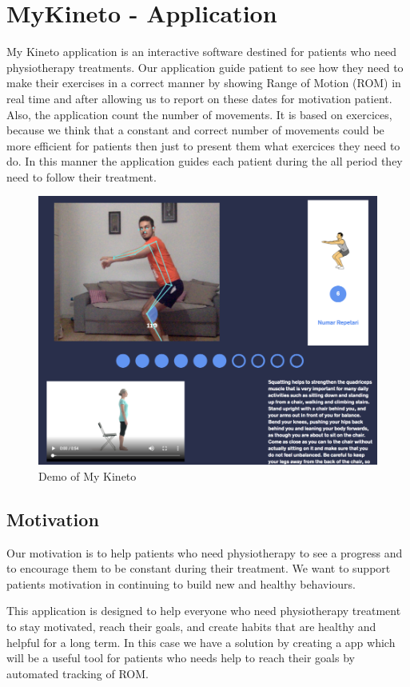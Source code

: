 
\chapter{MyKineto - Application}

\par My Kineto application is an interactive software destined for patients who need physiotherapy treatments. Our application guide patient to see how they need to make their exercises in a correct manner by showing Range of Motion (ROM) in real time and after allowing us to report on these dates for motivation patient. Also, the application count the number of movements. It is based on exercices, because we think that a constant and correct number of movements could be more efficient for patients then just to present them what exercices they need to do. In this manner the application guides each patient during the all period they need to follow their treatment. 
\begin{figure}[htbp]
	\centerline{\includegraphics[scale=0.8]{fig/demo-mykineto.png}}  
	\caption{Demo of My Kineto}
\end{figure}

\section{Motivation}
\par Our motivation is to help patients who need physiotherapy to see a progress and to encourage them to be constant during their treatment. We want to support patients motivation in continuing to build new and healthy behaviours. 
\par This application is designed to help everyone who need physiotherapy treatment to stay motivated, reach their goals, and create habits that are healthy and helpful for a long term. In this case we have a solution by creating a app which will be a useful tool for patients who needs help to reach their goals by automated tracking of ROM.

